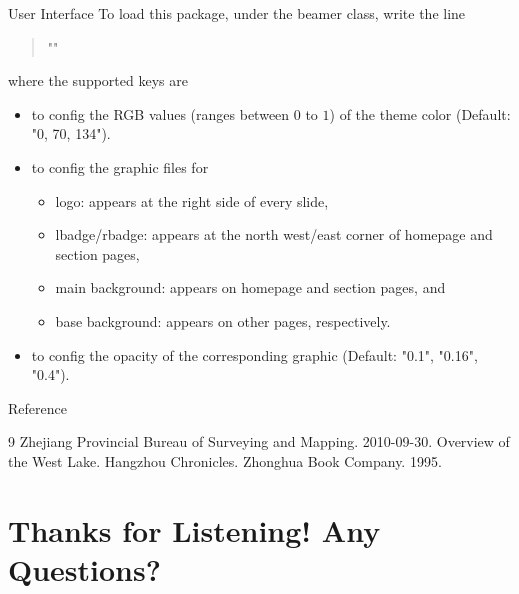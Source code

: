 \documentclass[handout, svgnames, aspectratio = 1610]{beamer}
\providecommand \pkg {\textsf}
\DeclareRobustCommand \meta[1]
  {\itshape \ensuremath \langle #1\/\ensuremath \rangle \upshape}
\begin{document}
\begin{frame}[t, fragile]{User Interface}
  To load this package, under the \pkg{beamer} class, write the line\par
  \begin{quote}
    "\usetheme["\meta{keys}"]{westlake}"
  \end{quote}\par
  where the supported keys are
  \begin{itemize}
    \item {} to config the RGB values
    (ranges between $0$ to $1$) of the theme color
    (Default: "{0, 70, 134}").
    \item {} to config the
    graphic files for
    \begin{itemize}
      \item logo: appears at the right side of every slide,
      \item lbadge/rbadge: appears at the north west/east corner of homepage
      and section pages,
      \item main background: appears on homepage and section pages, and
      \item base background: appears on other pages, respectively.
    \end{itemize}
    \item {} to config the
    opacity of the corresponding graphic (Default: "0.1", "0.16", "0.4").
  \end{itemize}
  { Reference}
  \begin{thebibliography}{9}
    Zhejiang Provincial Bureau of Surveying and Mapping. 2010-09-30.
    Overview of the West Lake. Hangzhou Chronicles.
    Zhonghua Book Company. 1995.
  \end{thebibliography}
\end{frame}

\section{Thanks for Listening! Any Questions?}
\end{document}
